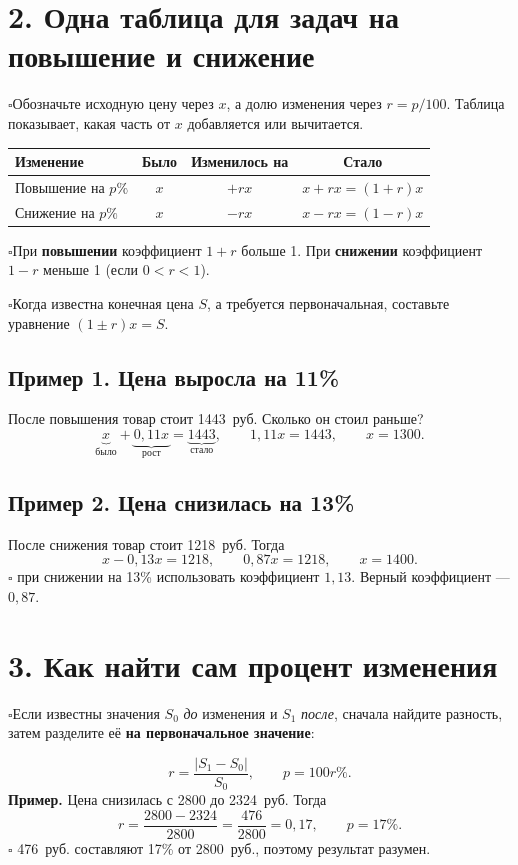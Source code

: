 \documentclass[a4paper,12pt]{article}
\newcommand{\checkitem}[1]{\noindent\(\square\)\enspace #1\par}
\newcommand{\keyterm}[1]{{\color{darkaccent}\textbf{#1}}}
\newcommand{\smallrule}{\par\vspace{.15em}{\color{lightline}\rule{\linewidth}{.35pt}}\vspace{.15em}}
\begin{document}
\smallrule
\section*{2. Одна таблица для задач на повышение и снижение}
\checkitem{Обозначьте исходную цену через \(x\), а долю изменения через \(r=p/100\). Таблица показывает, какая часть от \(x\) добавляется или вычитается.}
\begin{center}
\renewcommand{\arraystretch}{1.32}
\begin{tabularx}{\linewidth}{@{}Xccc@{}}
\toprule
\textbf{Изменение} & \textbf{Было} & \textbf{Изменилось на} & \textbf{Стало}\\
\midrule
Повышение на \(p\%\) & \(x\) & \(+rx\) & \(x+rx=(1+r)x\)\\
Снижение на \(p\%\) & \(x\) & \(-rx\) & \(x-rx=(1-r)x\)\\
\bottomrule
\end{tabularx}
\end{center}
\checkitem{При \keyterm{повышении} коэффициент \(1+r\) больше 1. При \keyterm{снижении} коэффициент \(1-r\) меньше 1 (если \(0<r<1\)).}
\checkitem{Когда известна конечная цена \(S\), а требуется первоначальная, составьте уравнение \((1\pm r)x=S\).}

\subsection*{Пример 1. Цена выросла на 11\%}
После повышения товар стоит 1443~руб. Сколько он стоил раньше?
\[
\underbrace{x}_{\text{было}}+\underbrace{0{,}11x}_{\text{рост}}=
\underbrace{1443}_{\text{стало}},\qquad
1{,}11x=1443,\qquad \boxed{x=1300.}
\]
\subsection*{Пример 2. Цена снизилась на 13\%}
После снижения товар стоит 1218~руб. Тогда
\[
x-0{,}13x=1218,\qquad 0{,}87x=1218,\qquad \boxed{x=1400.}\]
\checkitem{\keyterm{Типичная ошибка:} при снижении на 13\% использовать коэффициент \(1{,}13\). Верный коэффициент --- \(0{,}87\).}

\section*{3. Как найти сам процент изменения}
\checkitem{Если известны значения \(S_0\) \emph{до} изменения и \(S_1\) \emph{после}, сначала найдите разность, затем разделите её \keyterm{на первоначальное значение}:}
\[
\boxed{r=\frac{|S_1-S_0|}{S_0},\qquad p=100r\%.}
\]
\textbf{Пример.} Цена снизилась с 2800 до 2324~руб. Тогда
\[
r=\frac{2800-2324}{2800}=\frac{476}{2800}=0{,}17,
\qquad \boxed{p=17\%.}\]
\checkitem{\keyterm{Контроль:} 476~руб. составляют 17\% от 2800~руб., поэтому результат разумен.}
\end{document}
